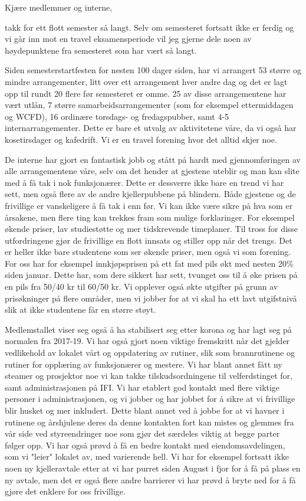 \documentclass[10pt,norsk,a4paper,usenames,dvipsnames]{article}
\begin{document}
    \begin{multicols}{2}


    Kjære medlemmer og interne,

    takk for ett flott semester så langt. Selv om semesteret fortsatt ikke er ferdig og vi går inn mot en travel eksamensperiode vil jeg gjerne dele noen av høydepunktene fra semesteret som har vært så langt.

    Siden semesterstartfesten for nesten 100 dager siden, har vi arrangert 53 større og mindre arrangementer, litt over ett arrangement hver andre dag og det er lagt opp til rundt 20 flere før semesteret er omme. 25 av disse arrangementene har vært utlån, 7 større samarbeidsarrangementer (som for eksempel ettermiddagen og WCFD), 16 ordinære torsdags- og fredagspubber, samt 4-5 internarrangementer. Dette er bare et utvalg av aktivitetene våre, da vi også har kosetirsdager og kafedrift. Vi er en travel forening hvor det alltid skjer noe.

    De interne har gjort en fantastisk jobb og stått på hardt med gjennomføringen av alle arrangementene våre, selv om det hender at gjestene uteblir og man kan slite med å få tak i nok funksjonærer. Dette er dessverre ikke bare en trend vi har sett, men også flere av de andre kjellerpubbene på blindern. Både gjestene og de frivillige er vanskeligere å få tak i enn før. Vi kan ikke være sikre på hva som er årsakene, men flere ting kan trekkes fram som mulige forklaringer. For eksempel økende priser, lav studiestøtte og mer tidskrevende timeplaner. Til tross for disse utfordringene gjør de frivillige en flott innsats og stiller opp når det trengs.
    Det er heller ikke bare studentene som ser økende priser, men også vi som forening. For oss har for eksempel innkjøpsprisen på ett fat med pils økt med nesten 20\% siden januar. Dette har, som dere sikkert har sett, tvunget oss til å øke prisen på en pils fra 50/40 kr til 60/50 kr. Vi opplever også økte utgifter på grunn av prisøkninger på flere områder, men vi jobber for at vi skal ha ett lavt utgifstnivå slik at ikke studentene får en større støyt.

    Medlemstallet viser seg også å ha stabilisert seg etter korona og har lagt seg på normalen fra 2017-19. Vi har også gjort noen viktige fremskritt når det gjelder vedlikehold av lokalet vårt og oppdatering av rutiner, slik som brannrutinene og rutiner for opplæring av funksjonærer og mestere. Vi har blant annet fått ny steamer og prosjektor noe vi kan takke tilskudsordningene til velferdstinget for, samt administrasjonen på IFI.
    Vi har etablert god kontakt med flere viktige personer i administrasjonen, og vi jobber og har jobbet for å sikre at vi frivillige blir husket og mer inkludert. Dette blant annet ved å jobbe for at vi havner i rutinene og årshjulene deres da denne kontakten fort kan mistes og glemmes fra vår side ved styreendringer noe som gjør det særdeles viktig at begge parter følger opp. Vi har også prøvd å få en bedre kontakt med eiendomsavdelingen, som vi "leier" lokalet av, med varierende hell. Vi har for eksempel fortsatt ikke noen ny kjelleravtale etter at vi har purret siden August i fjor for å få på plass en ny avtale, men det er også flere andre barrierer vi har prøvd å bryte ned for å få gjøre det enklere for oss frivillige.


\end{multicols}
\end{document}
